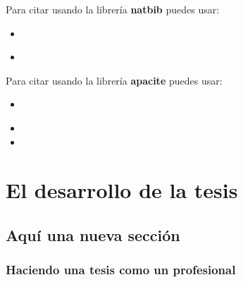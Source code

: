 Para citar usando la librería \textbf{natbib} puedes usar:

\begin{itemize}
	\item \citet{einstein}
	\item \citep{einstein}
\end{itemize}

Para citar usando la librería \textbf{apacite} puedes usar:

\begin{itemize}
	\item \cite{einstein}
	\item {}
	\item {}
\end{itemize}


\chapter{El desarrollo de la tesis}

\section{Aquí una nueva sección}

\subsection{Haciendo una tesis como un profesional}


	~ \lipsum[6]

	\newp ~ \lipsum[115]

	
